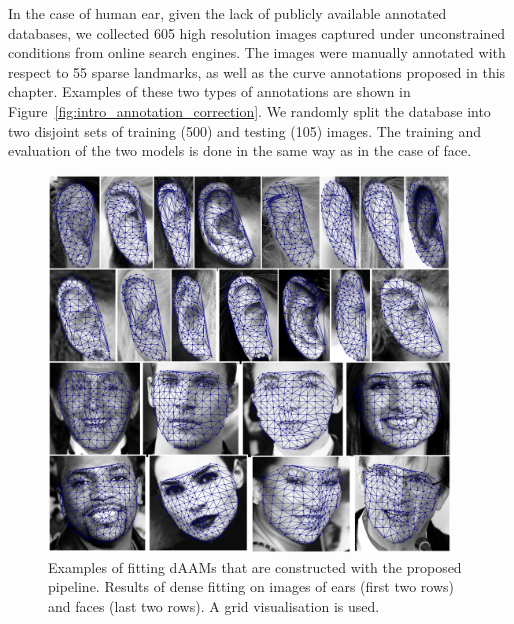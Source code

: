 In the case of human ear, given the lack of publicly available annotated databases, we collected 605 high resolution images captured under unconstrained conditions from online search engines. The images were manually annotated with respect to 55 sparse landmarks, as well as the curve annotations proposed in this chapter. Examples of these two types of annotations are shown in Figure~\ref{fig:intro_annotation_correction}. We randomly split the database into two disjoint sets of training (500) and testing (105) images. The training and evaluation of the two models is done in the same way as in the case of face.


\begin{figure}
    \centering
    \includegraphics[width=0.95\textwidth]{resources/Annotation_Correction/Suplementory_Meterial/Fittings/fittings}
    \caption{Examples of fitting dAAMs that are constructed with the proposed pipeline. Results of dense fitting on images of ears (first two rows) and faces (last two rows). A grid visualisation is used.}
    \label{fig:fr}
\end{figure}

